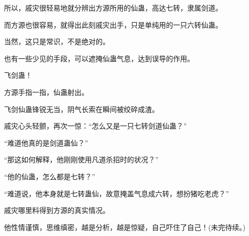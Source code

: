 \begin{this_body}
所以，戚灾很轻易地就分辨出方源所用的仙蛊，高达七转，隶属剑道。

而方源也很容易，就得出此刻戚灾出手，只是单纯用的一只六转仙蛊。

当然，这只是常识，不是绝对的。

也有一些少见的手段，可以遮掩仙蛊气息，达到误导的作用。

飞剑蛊！

方源手指一指，仙蛊射出。

飞剑仙蛊锋锐无当，阴气长索在瞬间被绞碎成渣。

戚灾心头轻颤，再次一惊：“怎么又是一只七转剑道仙蛊？”

“难道他真的是剑道蛊仙？”

“那这如何解释，他刚刚使用凡道杀招时的状况？”

“他的仙蛊，怎么都是七转？”

“难道说，他本身就是七转蛊仙，故意掩盖气息成六转，想扮猪吃老虎？”

戚灾哪里料得到方源的真实情况。

他性情谨慎，思维缜密，越是分析，越是惊疑，自己吓住了自己！(未完待续。)

\end{this_body}

